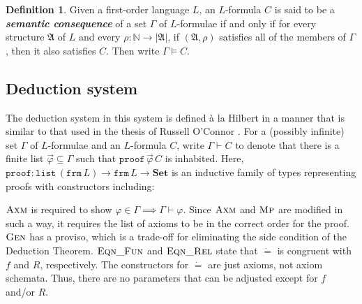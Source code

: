 \documentclass[twocolumn]{article}
\theoremstyle{definition}
\theoremstyle{definition}
\theoremstyle{definition}
\theoremstyle{definition}
\theoremstyle{definition}
\newtheorem{definition}[theorem]{Definition}
\theoremstyle{definition}
\theoremstyle{definition}
\newcommand{\inlinedef}[1]{\emph{\textbf{#1}}}
\newcommand{\IN}{\mathbb{N}}
\newcommand{\0}{\texttt{0}}
\newcommand{\1}{\texttt{1}}
\newcommand{\concat}{\ensuremath{+\!\!\!\!+\,}}
\newcommand{\Set}{\mathbf{Set}}
\newcommand{\FV}{\mathrm{FV}}
\newcommand{\proves}[2]{\mathtt{proof}\ #1\ #2 }
\newcommand{\listunit}[1]{[#1]}
\newcommand{\Leq}{\mathrel{\dot{=}}}
\newcommand{\Lto}{\mathrel{\dot{\to}}}
\newcommand{\Lall}[1]{\dot{\forall}#1\ }
\begin{document}
\begin{definition}
\label{d:model}
Given a first-order language $L$,
an $L$-formula $C$ is said to be a \inlinedef{semantic consequence} of a set $\Gamma$ of $L$-formulae if and only if
for every structure $\mathfrak{A}$ of $L$ and every $\rho : \IN \to | \mathfrak{A} |$, if $ (\mathfrak{A} , \rho ) $ satisfies all of the members of $\Gamma$, then it also satisfies $C$.
Then write $\Gamma \vDash C$.
\end{definition}

\subsection{Deduction system}
\label{ss:Deduction-system}

The deduction system in this system is defined à la Hilbert in a manner
that is similar to that used in the thesis of Russell O'Connor \cite{o2009incompleteness}.
For a (possibly infinite) set $\Gamma$ of $L$-formulae and an $L$-formula $C$,
write $\Gamma \vdash C$ to denote that there is a finite list $\vec{\varphi} \subseteq \Gamma$ such that $\mathtt{proof} \, \vec{\varphi} \, C$ is inhabited.
Here, $\mathtt{proof} : \mathtt{list} \, ( \mathtt{frm} \, L ) \to \mathtt{frm} \, L \to \Set$ is an inductive family of types representing proofs with constructors including:

$\textsc{Axm}$ is required to show $\varphi \in \Gamma \implies \Gamma \vdash \varphi$.
Since $\textsc{Axm}$ and $\textsc{Mp}$ are modified in such a way,
it requires the list of axioms to be in the correct order for the proof.
$\textsc{Gen}$ has a proviso, which is a trade-off for eliminating the side condition of the Deduction Theorem.
$\textsc{Eqn\_Fun}$ and $\textsc{Eqn\_Rel}$ state that $\Leq$ is congruent with $f$ and $R$, respectively.
The constructors for $\Leq$ are just axioms, not axiom schemata.
Thus, there are no parameters that can be adjusted except for $f$ and/or $R$.
\end{document}
